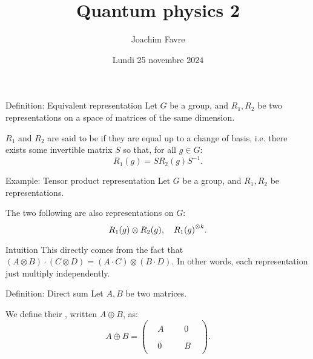 \documentclass[a4paper]{article}
\title{Quantum physics 2}
\author{Joachim Favre}
\date{Lundi 25 novembre 2024}
\begin{document}
\maketitle


\begin{parag}{Definition: Equivalent representation}
    Let $G$ be a group, and $R_1, R_2$ be two representations on a space of matrices of the same dimension.

    $R_1$ and $R_2$ are said to be  if they are equal up to a change of basis, i.e. there exists some invertible matrix $S$ so that, for all $g \in G$: 
    \[R_1\left(g\right) = S R_2\left(g\right) S^{-1}.\]
\end{parag}

\begin{parag}{Example: Tensor product representation}
    Let $G$ be a group, and $R_1, R_2$ be representations.

    The two following are also representations on $G$: 
    \[R_1\left(g\right) \otimes R_2\left(g\right), \mathspace R_1\left(g\right)^{\otimes k}.\]

    \begin{subparag}{Intuition}
        This directly comes from the fact that $\left(A \otimes B\right)\cdot \left(C \otimes D\right) = \left(A\cdot C\right) \otimes \left(B \cdot D\right)$. In other words, each representation just multiply independently.
    \end{subparag}
\end{parag}

\begin{parag}{Definition: Direct sum}
    Let $A, B$ be two matrices.

    We define their , written $A \oplus B$, as: 
    \[A \oplus B = \begin{pmatrix}  &  &  &  &  &  \\  & A &  &  & 0 &  \\  &  &  &  &  &  \\  &  &  &  &  &  \\  & 0 &  &  & B &  \\  &  &  &  &  &  \end{pmatrix}.\]
\end{parag}
 
\end{document}
